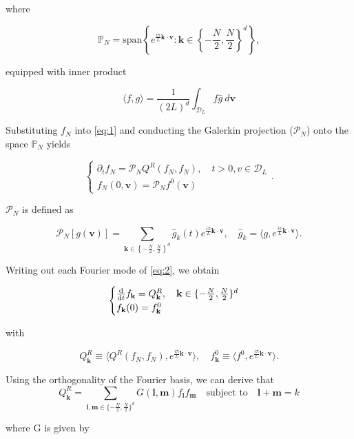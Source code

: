 \documentclass{article}
\def\b{\mathbf}
\def\t{\text}
\begin{document}
where 

\[
    \mathbb{P}_N = \t{span} \left\{ e^{\frac{i \pi}{L} \b k \cdot \b v } : \b k \in \left\{-\frac{N}{2}, \frac{N}{2}\right\}^d \right\},
\]

equipped with inner product

\[
    \langle f,g \rangle = \frac{1}{(2L)^d} \int_{\mathcal{D}_L} f \bar{g} \: d \b v\]

Substituting $f_N$ into \ref{eq:1} and conducting the Galerkin projection ($\mathcal{P}_N$) onto the space $\mathbb{P}_N$ yields

\begin{equation} \label{eq:2}
    \begin{cases}
        \partial_t f_N = \mathcal{P}_N Q^R(f_N,f_N), \quad t > 0, v\in \mathcal{D}_L\\
        f_N(0,\b v) = \mathcal{P}_N f^0(\b v)
    \end{cases}.
\end{equation}

$\mathcal{P}_N$ is defined as

\[
    \mathcal{P}_N [g(\b v)] = \sum_{\b k \in \left\{-\frac{N}{2}, \frac{N}{2}\right\}^d} \hat{g}_k(t) e^{\frac{i \pi}{L} \b k \cdot \b v }, \quad \hat{g}_k = \langle g, e^{\frac{i \pi}{L} \b k \cdot \b v } \rangle.
\]

Writing out each Fourier mode of \ref{eq:2}, we obtain

\begin{equation}
    \begin{cases}
        \frac{\t d}{\t d t} f_{\b k} = Q^R_{\b k}, \quad \mathbf{k} \in \{-\frac{N}{2}, \frac{N}{2}\}^d\\
        f_{\b k}(0) = f^0_{\mathbf{k}}
    \end{cases}
\end{equation}

with 

\[
    Q^R_{\b k} \equiv \langle Q^R(f_N, f_N), e^{\frac{i \pi}{L} \b k \cdot \b v } \rangle, \quad f^0_{\b k} \equiv \langle f^0, e^{\frac{i \pi}{L} \b k \cdot \b v} \rangle.
\]

Using the orthogonality of the Fourier basis, we can derive that
\begin{equation} \label{eq:QR}
    Q^R_{\b k} = \sum_{\b l,\b m \in \{-\frac{N}{2}, \frac{N}{2}\}^d} G(\b l,\b m) f_{\b l} f_{\b m} \quad \text{subject to} \quad \b l + \b m = k
\end{equation}

where G is given by
\end{document}
